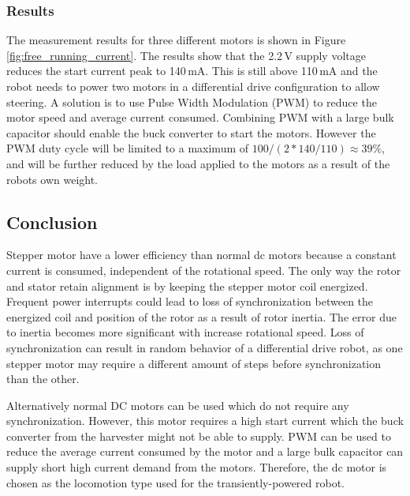 \subsubsection{Results}
The measurement results for three different motors is shown in Figure \ref{fig:free_running_current}.
The results show that the 2.2\,V supply voltage reduces the start current peak to 140\,mA.
This is still above 110\,mA and the robot needs to power two motors in a differential drive configuration to allow steering.
A solution is to use Pulse Width Modulation (PWM) to reduce the motor speed and average current consumed.
Combining PWM with a large bulk capacitor should enable the buck converter to start the motors.
However the PWM duty cycle will be limited to a maximum of $100/(2*140/110) \approx 39\%$, and will be further reduced by the load applied to the motors as a result of the robots own weight.


\subsection{Conclusion}
Stepper motor have a lower efficiency than normal dc motors because a constant current is consumed, independent of the rotational speed.
The only way the rotor and stator retain alignment is by keeping the stepper motor coil energized.
Frequent power interrupts could lead to loss of synchronization between the energized coil and position of the rotor as a result of rotor inertia.
The error due to inertia becomes more significant with increase rotational speed.
Loss of synchronization can result in random behavior of a differential drive robot, as one stepper motor may require a different amount of steps before synchronization than the other.

Alternatively normal DC motors can be used which do not require any synchronization.
However, this motor requires a high start current which the buck converter from the harvester might not be able to supply.
PWM can be used to reduce the average current consumed by the motor and a large bulk capacitor can supply short high current demand from the motors.
Therefore, the dc motor is chosen as the locomotion type used for the transiently-powered robot.

